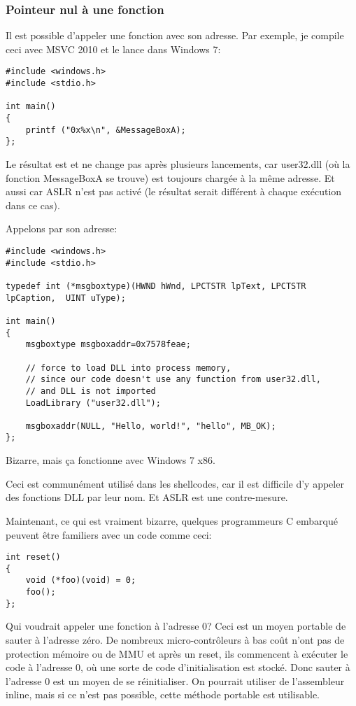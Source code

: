 \subsubsection{Pointeur nul à une fonction}

Il est possible d'appeler une fonction avec son adresse.
Par exemple, je compile ceci avec MSVC 2010 et le lance dans Windows 7:

\begin{lstlisting}[style=customc]
#include <windows.h>
#include <stdio.h>

int main()
{
	printf ("0x%x\n", &MessageBoxA);
};
\end{lstlisting}

Le résultat est  et ne change pas après plusieurs lancements, car user32.dll
(où la fonction MessageBoxA se trouve) est toujours chargée à la même adresse.
Et aussi car \ac{ASLR} n'est pas activé (le résultat serait différent à chaque exécution
dans ce cas).

Appelons  par son adresse:

\begin{lstlisting}[style=customc]
#include <windows.h>
#include <stdio.h>

typedef int (*msgboxtype)(HWND hWnd, LPCTSTR lpText, LPCTSTR lpCaption,  UINT uType);

int main()
{
	msgboxtype msgboxaddr=0x7578feae;

	// force to load DLL into process memory, 
	// since our code doesn't use any function from user32.dll, 
	// and DLL is not imported
	LoadLibrary ("user32.dll");

	msgboxaddr(NULL, "Hello, world!", "hello", MB_OK);
};
\end{lstlisting}

Bizarre, mais ça fonctionne avec Windows 7 x86.

Ceci est communément utilisé dans les shellcodes, car il est difficile d'y appeler
des fonctions DLL par leur nom.
Et \ac{ASLR} est une contre-mesure.

Maintenant, ce qui est vraiment bizarre, quelques programmeurs C embarqué peuvent
être familiers avec un code comme ceci:

\begin{lstlisting}[style=customc]
int reset()
{
	void (*foo)(void) = 0;
	foo();
};
\end{lstlisting}

Qui voudrait appeler une fonction à l'adresse 0?
Ceci est un moyen portable de sauter à l'adresse zéro.
De nombreux micro-contrôleurs à bas coût n'ont pas de protection mémoire ou de \ac{MMU}
et après un reset, ils commencent à exécuter le code à l'adresse 0, où une sorte
de code d'initialisation est stocké.
Donc sauter à l'adresse 0 est un moyen de se réinitialiser.
On pourrait utiliser de l'assembleur inline, mais si ce n'est pas possible, cette
méthode portable est utilisable.

